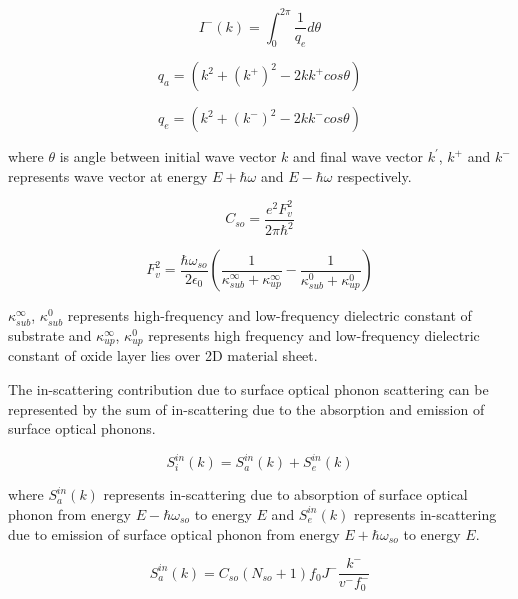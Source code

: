 \documentclass[12pt]{article}
\begin{document}
\begin{equation}
I^{-}(k) = \int_0^{2\pi} \frac{1}{q_{e}} d\theta 
\label{J_minus_so}
\end{equation}



\begin{equation}
q_{a} = \left( k^2 + \left( k^{+}\right)^2 - 2k k^{+} cos \theta \right)
\label{q_ab_so}
\end{equation}

\begin{equation}
q_{e} = \left( k^2 + \left( k^{-}\right)^2 - 2k k^{-} cos \theta \right)
\label{q_em_so}
\end{equation}

where $\theta $ is angle between initial wave vector $k$ and final wave vector $k^{'}$, $k^+$ and $k^-$ represents wave vector at energy $E+ \hbar \omega$ and $E- \hbar \omega$ respectively.

\begin{equation}
C_{so} = \frac{e^2 F_{v}^2}{2 \pi \hbar^2}  
\label{so_const}
\end{equation}

\begin{equation}
F_v^2 = \frac{\hbar \omega_{so}}{2 \epsilon_0 } \left( \frac{1}{\kappa_{sub}^{\infty} + \kappa_{up}^{\infty}} - \frac{1}{\kappa_{sub}^{0} + \kappa_{up}^{0}} \right)
\label{so_const}
\end{equation}

$\kappa_{sub}^{\infty}$, $\kappa_{sub}^{0}$ represents high-frequency and low-frequency dielectric constant of substrate and $\kappa_{up}^{\infty}$, $\kappa_{up}^{0}$ represents high frequency and low-frequency dielectric constant of oxide layer lies over 2D material sheet.
 
The in-scattering contribution due to surface optical phonon scattering can be represented by the sum of in-scattering due to the absorption and emission of surface optical phonons. 

\begin{equation}
S_i^{in}(k) = S_a^{in}(k) + S_e^{in}(k)
\label{in_sc_so}
\end{equation}

where $S_a^{in}(k)$ represents in-scattering due to absorption of surface optical phonon from energy $E-\hbar \omega_{so}$ to energy $E$ and $S_e^{in}(k)$ represents in-scattering due to emission of surface optical phonon from energy $E+\hbar \omega_{so}$ to energy $E$.
   
\begin{equation}
S_{a}^{in}(k) = C_{so} (N_{so}+1) f_{0}  J^- \frac{k^-}{v ^-f_{0}^-}
\label{ab_in_sc_so}
\end{equation}
\end{document}
